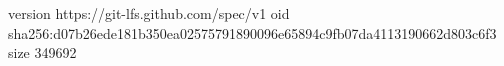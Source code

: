 version https://git-lfs.github.com/spec/v1
oid sha256:d07b26ede181b350ea02575791890096e65894c9fb07da4113190662d803c6f3
size 349692
